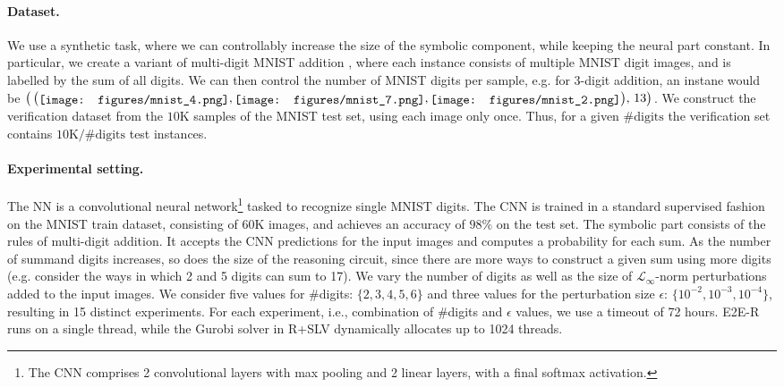 \paragraph{Dataset.} 
We use a synthetic task, where we can controllably increase the size of the symbolic component, while keeping the neural part constant. In particular, we create a variant of multi-digit MNIST addition \cite{manhaeve2018deepproblog}, where each instance consists of multiple MNIST digit images, and is labelled by the sum of all digits. We can then control the number of MNIST digits per sample, e.g. for 3-digit addition, an instane would be $\big( \, \big( \raisebox{-0.2\height} {\texttt{[image: figures/mnist\_4.png]}}, \raisebox{-0.2\height}{\texttt{[image: figures/mnist\_7.png]}}, \raisebox{-0.2\height}{\texttt{[image: figures/mnist\_2.png]}} \big), \, 13 \big)$. We construct the verification dataset from the $10\mathrm{K}$ samples of the MNIST test set, using each image only once. Thus, for a given $\#\text{digits}$ the verification set contains $10\mathrm{K} / \#\text{digits}$ test instances.

\paragraph{Experimental setting.} 
The NN is a convolutional neural network\footnote{The CNN comprises 2 convolutional layers with max pooling and 2 linear layers, with a final softmax activation.} tasked to recognize single MNIST digits. The CNN is trained in a standard supervised fashion on the MNIST train dataset, consisting of 60K images, and achieves an accuracy of $98\%$ on the test set. The symbolic part consists of the rules of multi-digit addition. It accepts the CNN predictions for the input images and computes a probability for each sum. As the number of summand digits increases, so does the size of the reasoning circuit, since there are more ways to construct a given sum using more digits (e.g. consider the ways in which 2 and 5 digits can sum to 17). We vary the number of digits as well as the size of $\mathcal{L}_{\infty}$-norm perturbations added to the input images. We consider five values for $\#$digits: $\{2, 3, 4, 5, 6\}$ and three values for the perturbation size $\epsilon$: $\{10^{-2}, 10^{-3}, 10^{-4}\}$, resulting in 15 distinct experiments. For each experiment, i.e., combination of $\#$digits and $\epsilon$ values, we use a timeout of 72 hours. \textsc{E2E-R} runs on a single thread, while the Gurobi solver in \textsc{R+SLV} dynamically allocates up to 1024 threads.



